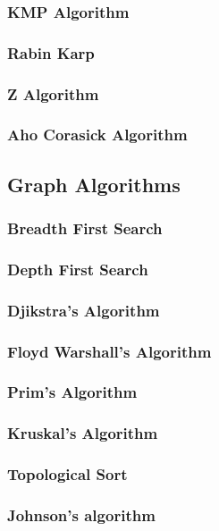 \documentclass[10pt,landscape,twocolumn]{article}
\begin{document}
\subsubsection{KMP Algorithm}
\subsubsection{Rabin Karp}
\subsubsection{Z Algorithm}
\subsubsection{Aho Corasick Algorithm}

\subsection{Graph Algorithms}
\subsubsection{Breadth First Search}
\subsubsection{Depth First Search}
\subsubsection{Djikstra's Algorithm}
\subsubsection{Floyd Warshall's Algorithm}
\subsubsection{Prim's Algorithm}
\subsubsection{Kruskal's Algorithm}
\subsubsection{Topological Sort}
\subsubsection{Johnson's algorithm}
\end{document}
